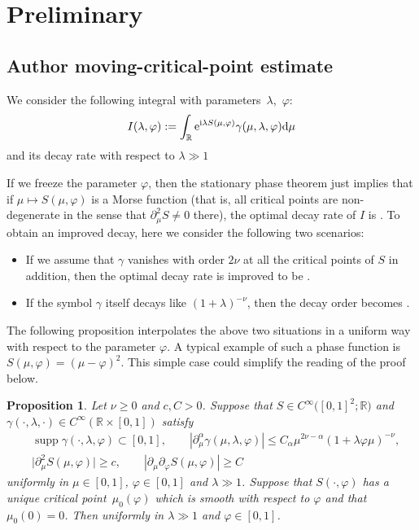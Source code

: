 \documentclass[11pt]{article}
\numberwithin{equation}{section}
\newtheorem{Proposition}[Theorem]{Proposition}
 { \theoremstyle{definition}
\newtheorem{Definition}[Theorem]{Definition}
\newtheorem{Note}[Theorem]{Note}
\newtheorem{Example}[Theorem]{Example}
\newtheorem{Remark}[Theorem]{Remark} }
\def\R{\mathbb{R}}%
\DeclareMathOperator{\supp}{supp}%
\def\a{\alpha}
\def\c{\gamma}
\def\f{\varphi}
\def\l{\lambda}
\def\m{\mu}
\def\n{\nu}
\def\pa{\partial}
\begin{document}
\section{Preliminary}

\setcounter{subsection}{3}\setcounter{Theorem}{3}\subsection*{Author moving-critical-point estimate}
We consider the following integral with parameters~$\l$,~$\f$:
\begin{align*}
I(\l,\f):=\int_{\R}{\rm e}^{{\rm i}\l S(\m,\f)}\c(\m,\l,\f){\rm d}\m
\end{align*}
and its decay rate with respect to $\l\gg 1$

If we freeze the parameter $\f$, then the stationary phase theorem just implies that if $\m\mapsto S(\m,\f)$ is a Morse function (that is, all critical points are non-degenerate in the sense that $\pa_{\m}^2S\neq 0$ there), the optimal decay rate of $I$ is \smash{$\l^{-\frac{1}{2}}$}. To obtain an improved decay, here we consider the following two scenarios:
\begin{itemize}\itemsep=0pt
\item If we assume that $\c$ vanishes with order $2\n$ at all the critical points of $S$ in addition, then the optimal decay rate is improved to be \smash{$\l^{-\frac{1}{2}-\n}$}.
\item If the symbol $\c$ itself decays like $(1+\l)^{-\n}$, then the decay order becomes \smash{$\l^{-\frac{1}{2}-\n}$}.
\end{itemize}
The following proposition interpolates the above two situations in a uniform way with respect to the parameter $\f$.
A typical example of such a phase function is $S(\m,\f)=(\m-\f)^2$. This simple case could simplify the reading of the proof below.

\begin{Proposition}\label{Stphasemovecrit}
Let $\n\geq 0$ and $c, C>0$. Suppose that $S\in C^{\infty}\bigl([0,1]^2;\R\bigr)$ and $\c(\cdot,\l,\cdot)\in C^{\infty}(\R\times [0,1])$ satisfy
\begin{align*}
&\supp \c(\cdot,\l,\f)\subset [0,1],\qquad |\pa_{\m}^{\a}\c(\m,\l,\f)|\leq C_{\a}\m^{2\n-\a}(1+\l \f\m)^{-\n},\\
&
\big|\pa_{\m}^2S(\m,\f)\big|\geq c,\qquad |\pa_{\m}\pa_{\f}S(\m,\f)|\geq C%
\end{align*}
uniformly in $\m\in [0,1]$, $\f\in [0,1]$ and $\l\gg 1$. Suppose that $S(\cdot,\f)$ has a unique critical point~${\m_0(\f)}$ which is smooth with respect to $\f$ and that $\m_0(0)=0$. Then
 \smash{$|I(\l,\f)|\lesssim \l^{-\n-\frac{1}{2}}$} uniformly in $\l\gg 1$ and $\f\in [0,1]$.
\end{Proposition}
\end{document}

